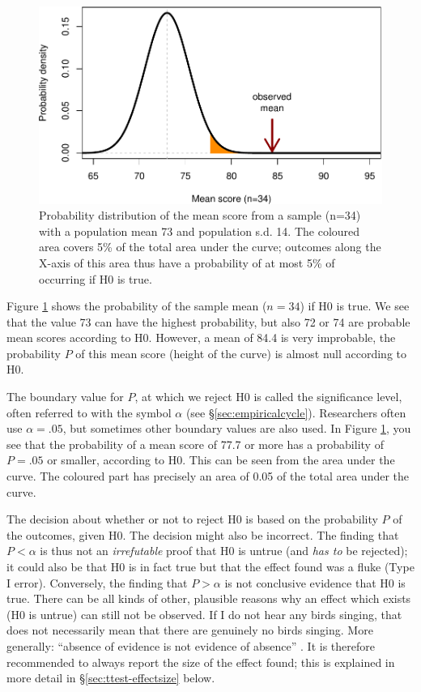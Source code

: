 \documentclass[
]{book}
\begin{document}
\begin{figure}
\centering
\includegraphics{QMS-EN_files/figure-latex/gramm2013onesample-1.pdf}
\caption{\label{fig:gramm2013onesample}Probability distribution of the mean score from a sample (n=34) with a population mean 73 and population s.d. 14. The coloured area covers 5\% of the total area under the curve; outcomes along the X-axis of this area thus have a probability of at most 5\% of occurring if H0 is true.}
\end{figure}

Figure \ref{fig:gramm2013onesample} shows the probability of the
sample mean (\(n=34\)) if H0 is true. We see that the value 73 can have
the highest probability, but also 72 or 74 are probable mean scores
according to H0. However, a mean of 84.4 is very improbable, the probability
\(P\) of this mean score (height of the curve) is almost null according to
H0.

The boundary value for \(P\), at which we reject H0 is called the significance
level, often referred to with the symbol \(\alpha\) (see
§\ref{sec:empiricalcycle}). Researchers often use \(\alpha=.05\),
but sometimes other boundary values are also used. In Figure
\ref{fig:gramm2013onesample}, you see that the probability of a mean score
of 77.7 or more has a probability of \(P=.05\) or smaller, according to
H0. This can be seen from the area under the curve. The coloured part has
precisely an area of 0.05 of the total area under
the curve.

The decision about whether or not to reject H0 is based on the probability
\(P\) of the outcomes, given H0. The decision might also be
incorrect. The finding that \(P < \alpha\) is thus not an
\emph{irrefutable} proof that H0 is untrue (and \emph{has to} be
rejected); it could also be that H0 is in fact true but that the
effect found was a fluke (Type I error). Conversely, the finding
that \(P > \alpha\) is not conclusive evidence that H0 is true. There can
be all kinds of other, plausible reasons why an effect which exists (H0 is untrue)
can still not be observed. If I do not hear any birds singing, that does not necessarily
mean that there are genuinely no birds singing. More generally: ``absence of evidence is not
evidence of absence'' \citetext{\citealp[p.121]{Sagan96}; \citealp{Alde04}}. It is therefore recommended to always report the size of the effect found; this is explained in more detail in
§\ref{sec:ttest-effectsize} below.
\end{document}
